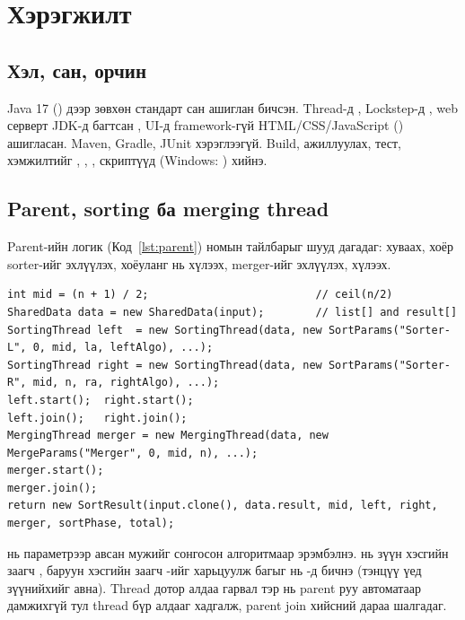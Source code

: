 \chapter{Хэрэгжилт}\label{ch:impl}

\section{Хэл, сан, орчин}
Java 17 () дээр зөвхөн стандарт сан ашиглан бичсэн. Thread-д ,
Lockstep-д , web серверт JDK-д багтсан ,
UI-д framework-гүй HTML/CSS/JavaScript () ашигласан. Maven, Gradle, JUnit хэрэглээгүй.
Build, ажиллуулах, тест, хэмжилтийг , , ,  скриптүүд
(Windows: ) хийнэ.

\section{Parent, sorting ба merging thread}
Parent-ийн логик (Код~\ref{lst:parent}) номын тайлбарыг шууд дагадаг: хуваах, хоёр sorter-ийг эхлүүлэх,
хоёуланг нь хүлээх, merger-ийг эхлүүлэх, хүлээх.

\begin{lstlisting}[caption={Parent thread (\code{MultithreadedSorter.sort}, trace ба gate-ийн мөрийг товчлов)},label={lst:parent}]
int mid = (n + 1) / 2;                          // ceil(n/2)
SharedData data = new SharedData(input);        // list[] and result[]
SortingThread left  = new SortingThread(data, new SortParams("Sorter-L", 0, mid, la, leftAlgo), ...);
SortingThread right = new SortingThread(data, new SortParams("Sorter-R", mid, n, ra, rightAlgo), ...);
left.start();  right.start();
left.join();   right.join();
MergingThread merger = new MergingThread(data, new MergeParams("Merger", 0, mid, n), ...);
merger.start();
merger.join();
return new SortResult(input.clone(), data.result, mid, left, right, merger, sortPhase, total);
\end{lstlisting}

 нь параметрээр авсан \code{[startIndex, endIndex)} мужийг сонгосон алгоритмаар
эрэмбэлнэ.  нь зүүн хэсгийн заагч , баруун хэсгийн заагч -ийг харьцуулж багыг
нь -д бичнэ (тэнцүү үед зүүнийхийг авна). Thread дотор алдаа гарвал тэр нь parent руу автоматаар
дамжихгүй тул thread бүр алдааг хадгалж, parent join хийсний дараа шалгадаг.

